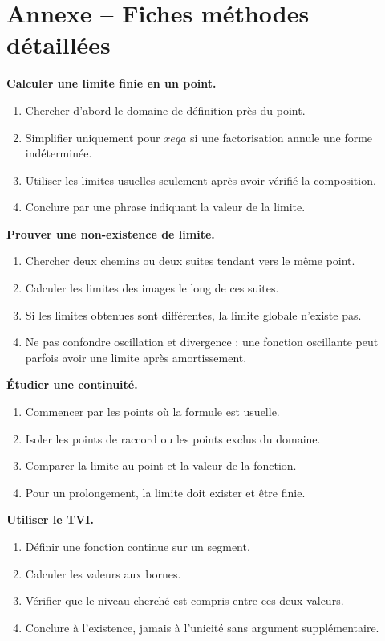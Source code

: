 \documentclass[11pt,a4paper]{article}
\begin{document}
\section{Annexe -- Fiches méthodes détaillées}
\begin{fichebox}
\textbf{Calculer une limite finie en un point.}
\begin{enumerate}
\item Chercher d'abord le domaine de définition près du point.
\item Simplifier uniquement pour $x
eq a$ si une factorisation annule une forme indéterminée.
\item Utiliser les limites usuelles seulement après avoir vérifié la composition.
\item Conclure par une phrase indiquant la valeur de la limite.
\end{enumerate}
\end{fichebox}
\begin{fichebox}
\textbf{Prouver une non-existence de limite.}
\begin{enumerate}
\item Chercher deux chemins ou deux suites tendant vers le même point.
\item Calculer les limites des images le long de ces suites.
\item Si les limites obtenues sont différentes, la limite globale n'existe pas.
\item Ne pas confondre oscillation et divergence : une fonction oscillante peut parfois avoir une limite après amortissement.
\end{enumerate}
\end{fichebox}
\begin{fichebox}
\textbf{Étudier une continuité.}
\begin{enumerate}
\item Commencer par les points où la formule est usuelle.
\item Isoler les points de raccord ou les points exclus du domaine.
\item Comparer la limite au point et la valeur de la fonction.
\item Pour un prolongement, la limite doit exister et être finie.
\end{enumerate}
\end{fichebox}
\begin{fichebox}
\textbf{Utiliser le TVI.}
\begin{enumerate}
\item Définir une fonction continue sur un segment.
\item Calculer les valeurs aux bornes.
\item Vérifier que le niveau cherché est compris entre ces deux valeurs.
\item Conclure à l'existence, jamais à l'unicité sans argument supplémentaire.
\end{enumerate}
\end{fichebox}
\end{document}
